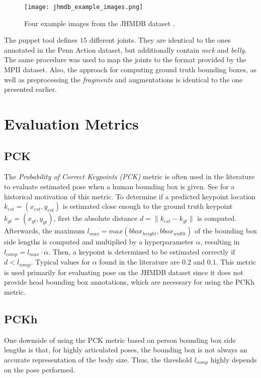 \begin{figure}[htb!]
    \centering
    \texttt{[image: jhmdb\_example\_images.png]}
    \caption{Four example images from the JHMDB dataset \cite{jhuang_towards_2013}. }
    \label{fig:jhmdb_example_images}
\end{figure}

The puppet tool defines $15$ different joints.
They are identical to the ones annotated in the Penn Action dataset, but additionally contain \textit{neck} and \textit{belly}.
The same procedure was used to map the joints to the format provided by the MPII dataset.
Also, the approach for computing ground truth bounding boxes, as well as preprocessing the \textit{fragments} and augmentations is identical to the one presented earlier.

\section{Evaluation Metrics}
\subsection{PCK}
\label{sec:exp-pck}

The \textit{Probability of Correct Keypoints (PCK)} metric \cite{ferrari_progressive_2008} is often used in the literature to evaluate estimated pose when a human bounding box is given.
See  for a historical motivation of this metric.
To determine if a predicted keypoint location $k_{est} = (x_{est}, y_{est})$ is estimated close enough to the ground truth keypoint $k_{gt} = (x_{gt}, y_{gt})$, first the absolute distance $d = \lVert k_{est} - k_{gt} \rVert$ is computed.
Afterwards, the maximum $l_{max} = max(bbox_{height}, bbox_{width})$ of the bounding box side lengths is computed and multiplied by a hyperparameter $\alpha$, resulting in $l_{comp} = l_{max} \cdot \alpha$.
Then, a keypoint is determined to be estimated correctly if $d < l_{comp}$.
Typical values for $\alpha$ found in the literature are $0.2$ and $0.1$.
This metric is used primarily for evaluating pose on the JHMDB dataset since it does not provide head bounding box annotations, which are necessary for using the PCKh metric.

\subsection{PCKh}
\label{sec:exp-pckh}
One downside of using the PCK metric based on person bounding box side lengths is that, for highly articulated poses, the bounding box is not always an accurate representation of the body size.
Thus, the threshold $l_{comp}$ highly depends on the pose performed.

